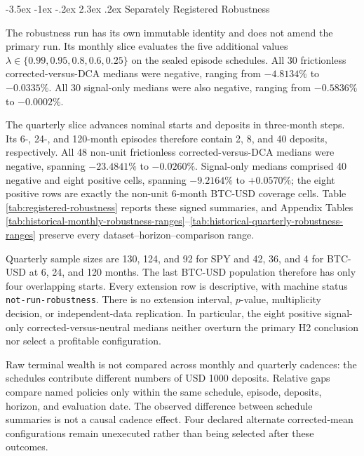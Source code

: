 \documentclass[12pt,a4paper,oneside]{report}
\makeatletter
\renewcommand\section{\@startsection{section}{1}{\z@}%
  {-3.5ex \@plus -1ex \@minus -.2ex}%
  {2.3ex \@plus .2ex}%
  {\normalfont\fontsize{14}{17}\selectfont\bfseries}}
\makeatother
\begin{document}
\section{Separately Registered Robustness}
\label{sec:registered-robustness}

The robustness run has its own immutable identity and does not amend the
primary run. Its monthly slice evaluates the five additional values
$\lambda\in\{0.99,0.95,0.8,0.6,0.25\}$ on the sealed episode schedules.
All 30 frictionless corrected-versus-DCA medians were negative, ranging from
$-4.8134\%$ to $-0.0335\%$. All 30 signal-only medians were also negative,
ranging from $-0.5836\%$ to $-0.0002\%$.

The quarterly slice advances nominal starts and deposits in three-month steps.
Its 6-, 24-, and 120-month episodes therefore contain 2, 8, and 40 deposits,
respectively. All 48 non-unit frictionless corrected-versus-DCA medians were
negative, spanning $-23.4841\%$ to $-0.0260\%$. Signal-only medians comprised
40 negative and eight positive cells, spanning $-9.2164\%$ to $+0.0570\%$;
the eight positive rows are exactly the non-unit 6-month BTC-USD coverage
cells. Table \ref{tab:registered-robustness} reports these signed summaries,
and Appendix Tables \ref{tab:historical-monthly-robustness-ranges}--\ref{tab:historical-quarterly-robustness-ranges}
preserve every
dataset--horizon--comparison range.

Quarterly sample sizes are 130, 124, and 92 for SPY and 42, 36, and 4 for
BTC-USD at 6, 24, and 120 months. The last BTC-USD population therefore has
only four overlapping starts. Every extension row is descriptive, with
machine status \texttt{not-run-robustness}. There is no extension interval,
$p$-value, multiplicity decision, or independent-data replication. In
particular, the eight positive signal-only corrected-versus-neutral medians
neither overturn the primary H2 conclusion nor select a profitable
configuration.

Raw terminal wealth is not compared across monthly and quarterly cadences:
the schedules contribute different numbers of USD 1000 deposits. Relative
gaps compare named policies only within the same schedule, episode, deposits,
horizon, and evaluation date. The observed difference between schedule
summaries is not a causal cadence effect. Four declared alternate
corrected-mean configurations remain unexecuted rather than being selected after these
outcomes.


\end{document}
